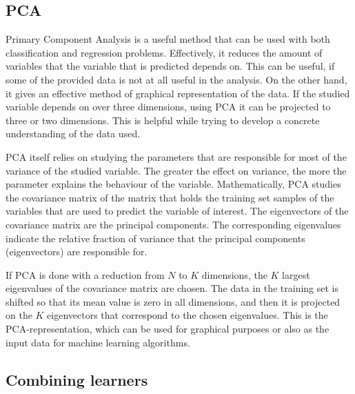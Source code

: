 \documentclass[twoside]{article}
\begin{document}
\begin{multicols}{2}
\subsection{PCA}\label{method:pca}

Primary Component Analysis is a useful method that can be used with both classification and regression
problems. Effectively, it reduces the amount of variables that the variable that is predicted depends
on. This can be useful, if some of the provided data is not at all useful in the analysis. On the other
hand, it gives an effective method of graphical representation of the data. If the studied variable
depends on over three dimensions, using PCA it can be projected to three or two dimensions. This is
helpful while trying to develop a concrete understanding of the data used.

PCA itself relies on studying the parameters that are responsible for most of the variance of the studied
variable. The greater the effect on variance, the more the parameter explains the behaviour of the variable.
Mathematically, PCA studies the covariance matrix of the matrix that holds the training set samples of the 
variables that are used to predict the variable of interest. The eigenvectors of the covariance matrix are
the principal components. The corresponding eigenvalues indicate the relative fraction of variance that
the principal components (eigenvectors) are responsible for. 

If PCA is done with a reduction from $N$ to
$K$ dimensions, the $K$ largest eigenvalues of the covariance matrix are chosen. The data in the training set is shifted so that
its mean value is zero in all dimensions, and then it is projected on the $K$ eigenvectors that correspond
to the chosen eigenvalues. This is the PCA-representation, which can be used for graphical purposes or
also as the input data for machine learning algorithms.

\subsection{Combining learners}\label{method:combo}


\end{multicols}
\end{document}
